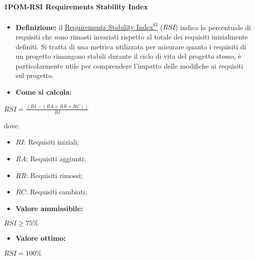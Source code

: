 \paragraph*{1POM-RSI Requirements Stability Index}
\begin{itemize}
    \item \textbf{Definizione:} il \href{https://code7crusaders.github.io/docs/RTB/documentazione_interna/glossario.html#requirements-stability-index}{Requirements Stability Index\textsuperscript{G}} ($RSI$) indica la percentuale di requisiti che sono rimasti invariati rispetto al totale dei requisiti inizialmente definiti. Si tratta di una metrica utilizzata per misurare quanto i requisiti di un progetto rimangono stabili durante il ciclo di vita del progetto stesso, è particolarmente utile per comprendere l’impatto delle modifiche ai requisiti sul progetto.
    \item \textbf{Come si calcola:}
\end{itemize}
\begin{center}
    $RSI = \frac{(RI-(RA + RR + RC))}{RI}$ 
 \end{center}
 dove:
 \begin{itemize}[label=$\rightarrow$]
     \item $RI$: Requisiti iniziali;
     \item $RA$: Requisiti aggiunti;
     \item $RR$: Requisiti rimossi;
     \item $RC$: Requisiti cambiati;
 \end{itemize}
\begin{itemize}
    \item \textbf{Valore ammissibile:}
\end{itemize}
\begin{center}
    $RSI \geq 75\%$
\end{center}
\begin{itemize}
    \item \textbf{Valore ottimo:}
\end{itemize}
\begin{center}
    $RSI = 100\%$
\end{center}
